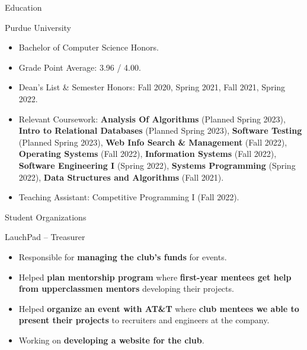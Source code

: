 \documentclass{article}
\newlength{\tabin}
\newlength{\secsep}
\newcommand{\lineunder}{\vspace*{-8pt} \\ \hspace*{-6pt} \hrulefill \\ \vspace*{-15pt}}
\newenvironment{tabbedsection}[1]{
  \begin{list}{}{
      \setlength{\itemsep}{0pt}
      \setlength{\labelsep}{0pt}
      \setlength{\labelwidth}{0pt}
      \setlength{\leftmargin}{\tabin}
      \setlength{\rightmargin}{\tabin}
      \setlength{\listparindent}{0pt}
      \setlength{\parsep}{0pt}
      \setlength{\parskip}{0pt}
      \setlength{\partopsep}{0pt}
      \setlength{\topsep}{#1}
    }
  \item[]
}{\end{list}}
\newenvironment{resume_section}[1]{
  \filbreak
  \vspace{2\secsep}
  \textsc{\large#1}
  \lineunder
  \begin{tabbedsection}{\secsep}
}{\end{tabbedsection}}
\newenvironment{resume_subsection}[2][]{
  \textbf{#2} \hfill {\footnotesize #1} \hspace{2em}
  \begin{tabbedsection}{0.5\secsep}
}{\end{tabbedsection}}
\newenvironment{subitems}{
  \renewcommand{\labelitemi}{-}
  \begin{itemize}
      \setlength{\labelsep}{1em}
}{\end{itemize}}
\begin{document}
\begin{resume_section}{Education}
  
  \begin{resume_subsection}{Purdue University}
    
    \begin{subitems}
      \item Bachelor of Computer Science Honors.
      \item Grade Point Average: 3.96 / 4.00.  	
  	  \item Dean's List \& Semester Honors: Fall 2020, Spring 2021, Fall 2021, Spring 2022.
  	  \item Relevant Coursework: \textbf{Analysis Of Algorithms} (Planned Spring 2023), \textbf{Intro to Relational Databases} (Planned Spring 2023), \textbf{Software Testing} (Planned Spring 2023), \textbf{Web Info Search \& Management} (Fall 2022), \textbf{Operating Systems} (Fall 2022), \textbf{Information Systems} (Fall 2022), \textbf{Software Engineering I} (Spring 2022), \textbf{Systems Programming} (Spring 2022), \textbf{Data Structures and Algorithms} (Fall 2021).
  	  \item Teaching Assistant: Competitive Programming I (Fall 2022).
	\end{subitems}  	
  	
  \end{resume_subsection}
  
\end{resume_section}

\begin{resume_section}{Student Organizations}

	\begin{resume_subsection}{LauchPad -- Treasurer}
    \begin{subitems}
		\item Responsible for \textbf{managing the club's funds} for events.
		\item Helped \textbf{plan mentorship program} where \textbf{first-year mentees get help from upperclassmen mentors} developing their projects.
		\item Helped \textbf{organize an event with AT\&T} where \textbf{club mentees we able to present their projects} to recruiters and engineers at the company.
		\item Working on \textbf{developing a website for the club}.
	\end{subitems}  
	\end{resume_subsection}
	
	
\end{resume_section}
\end{document}

